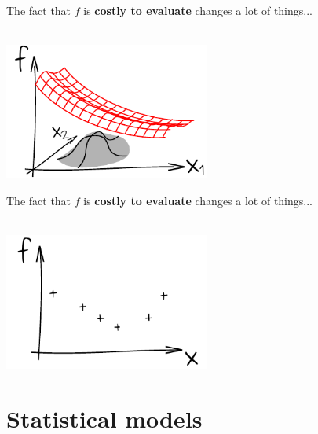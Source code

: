 \begin{frame}{}
The fact that $f$ is \textbf{costly to evaluate} changes a lot of things...\\
\vspace{5mm}
\\
\vspace{5mm}
\begin{center}
\includegraphics[height=4.5cm]{1_stat_models/figures/ink_as}
\end{center}
\end{frame}

\begin{frame}{}
The fact that $f$ is \textbf{costly to evaluate} changes a lot of things...\\
\vspace{5mm}
\\
\vspace{5mm}
\begin{center}
\includegraphics[height=4.5cm]{1_stat_models/figures/ink_fX}
\end{center}
\end{frame}

\section[Statistical models]{Statistical models}
